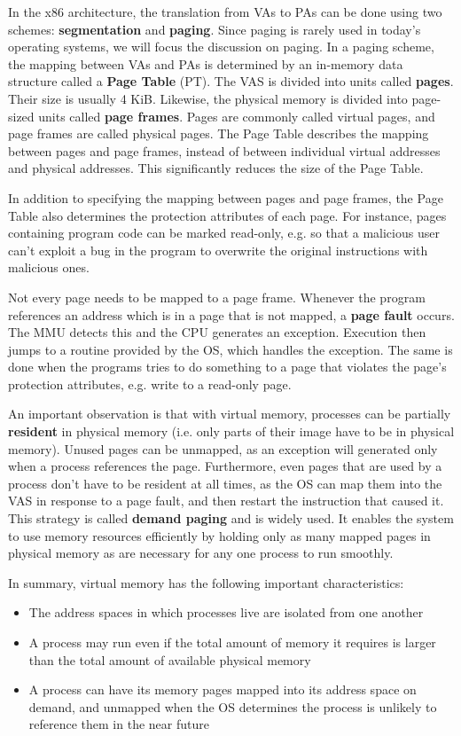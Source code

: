 \documentclass[shortabstract, english]{iithesis}
\begin{document}
In the x86 architecture, the translation from VAs to PAs can be done using two
schemes: \textbf{segmentation} and \textbf{paging}. Since paging is rarely used
in today's operating systems, we will focus the discussion on paging. In a
paging scheme, the mapping between VAs and PAs is determined by an in-memory
data structure called a \textbf{Page Table} (PT). The VAS is divided into units
called \textbf{pages}. Their size is usually 4 KiB. Likewise, the physical
memory is divided into page-sized units called \textbf{page frames}. Pages are
commonly called virtual pages, and page frames are called physical pages. The
Page Table describes the mapping between pages and page frames, instead of
between individual virtual addresses and physical addresses. This significantly
reduces the size of the Page Table.

In addition to specifying the mapping between pages and page frames, the Page
Table also determines the protection attributes of each page. For instance,
pages containing program code can be marked read-only, e.g. so that a malicious
user can't exploit a bug in the program to overwrite the original instructions
with malicious ones.

Not every page needs to be mapped to a page frame. Whenever the program
references an address which is in a page that is not mapped, a \textbf{page
  fault} occurs. The MMU detects this and the CPU generates an exception.
Execution then jumps to a routine provided by the OS, which handles the
exception. The same is done when the programs tries to do something to a page
that violates the page's protection attributes, e.g. write to a read-only page.

An important observation is that with virtual memory, processes can be partially
\textbf{resident} in physical memory (i.e. only parts of their image have to be
in physical memory). Unused pages can be unmapped, as an exception will
generated only when a process references the page. Furthermore, even pages that
are used by a process don't have to be resident at all times, as the OS can map
them into the VAS in response to a page fault, and then restart the instruction
that caused it. This strategy is called \textbf{demand paging} and is widely
used. It enables the system to use memory resources efficiently by holding only
as many mapped pages in physical memory as are necessary for any one process to
run smoothly.

In summary, virtual memory has the following important characteristics:
\begin{itemize}
\item The address spaces in which processes live are isolated from one another
\item A process may run even if the total amount of memory it requires is larger
  than the total amount of available physical memory
\item A process can have its memory pages mapped into its address space on
  demand, and unmapped when the OS determines the process is unlikely to
  reference them in the near future
\end{itemize}
\end{document}
